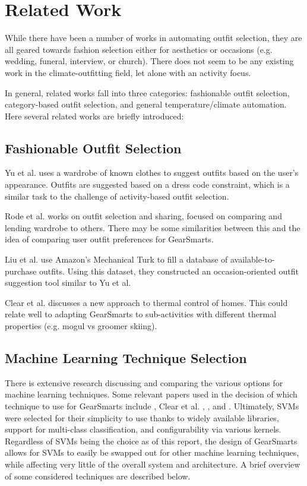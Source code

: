 \section{Related Work}
\label{section:relatedwork}
While there have been a number of works in automating outfit selection, they are all geared towards
fashion selection either for aesthetics or occasions (e.g. wedding, funeral, interview, or church).
There does not seem to be any existing work in the climate-outfitting field, let alone with an
activity focus.

In general, related works fall into three categories: fashionable outfit selection, category-based
outfit selection, and general temperature/climate automation. Here several related works are briefly introduced:

\subsection{Fashionable Outfit Selection}
Yu et al. \cite{Dressup} uses a wardrobe of known clothes to suggest outfits based on the user's appearance.
Outfits are suggested based on a dress code constraint, which is a similar task to
the challenge of activity-based outfit selection.

Rode et al. \cite{SmartCloset} works on outfit selection and sharing, focused on comparing and lending wardrobe
to others. There may be some similarities between this and the idea of comparing user outfit preferences
for GearSmarts.

Liu et al. \cite{MagicCloset} use Amazon's Mechanical Turk to fill a database of available-to-purchase outfits.
Using this dataset, they constructed an occasion-oriented outfit suggestion tool similar to Yu et al.\cite{Dressup}

Clear et al. \cite{ThermalComfort} discusses a new approach to thermal control of homes. This could relate well to
adapting GearSmarts to sub-activities with different thermal properties (e.g. mogul vs groomer skiing).

\subsection{Machine Learning Technique Selection}
There is extensive research discussing and comparing the various options for machine learning techniques.
Some relevant papers used in the decision of which technique to use for GearSmarts include \cite{ML:MapReduceClusters},
Clear et al. \cite{ML:ManufacturingSystems}, \cite{ML:IPTraffic}, and \cite{ML:GeoMapping}. Ultimately, SVMs were selected
for their simplicity to use thanks to widely available libraries, support for multi-class classification, and configurability
via various kernels. Regardless of SVMs being the choice as of this report, the design of GearSmarts allows for SVMs
to easily be swapped out for other machine learning techniques, while affecting very little of the overall system and
architecture. A brief overview of some considered techniques are described below.

